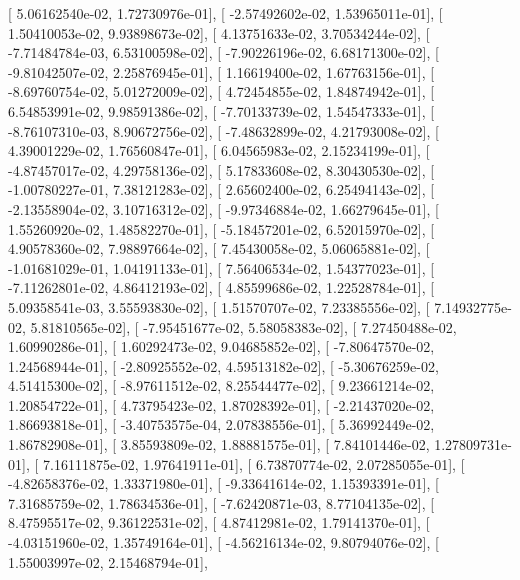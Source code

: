 \documentclass{article}
\begin{document}
       [  5.06162540e-02,   1.72730976e-01],
       [ -2.57492602e-02,   1.53965011e-01],
       [  1.50410053e-02,   9.93898673e-02],
       [  4.13751633e-02,   3.70534244e-02],
       [ -7.71484784e-03,   6.53100598e-02],
       [ -7.90226196e-02,   6.68171300e-02],
       [ -9.81042507e-02,   2.25876945e-01],
       [  1.16619400e-02,   1.67763156e-01],
       [ -8.69760754e-02,   5.01272009e-02],
       [  4.72454855e-02,   1.84874942e-01],
       [  6.54853991e-02,   9.98591386e-02],
       [ -7.70133739e-02,   1.54547333e-01],
       [ -8.76107310e-03,   8.90672756e-02],
       [ -7.48632899e-02,   4.21793008e-02],
       [  4.39001229e-02,   1.76560847e-01],
       [  6.04565983e-02,   2.15234199e-01],
       [ -4.87457017e-02,   4.29758136e-02],
       [  5.17833608e-02,   8.30430530e-02],
       [ -1.00780227e-01,   7.38121283e-02],
       [  2.65602400e-02,   6.25494143e-02],
       [ -2.13558904e-02,   3.10716312e-02],
       [ -9.97346884e-02,   1.66279645e-01],
       [  1.55260920e-02,   1.48582270e-01],
       [ -5.18457201e-02,   6.52015970e-02],
       [  4.90578360e-02,   7.98897664e-02],
       [  7.45430058e-02,   5.06065881e-02],
       [ -1.01681029e-01,   1.04191133e-01],
       [  7.56406534e-02,   1.54377023e-01],
       [ -7.11262801e-02,   4.86412193e-02],
       [  4.85599686e-02,   1.22528784e-01],
       [  5.09358541e-03,   3.55593830e-02],
       [  1.51570707e-02,   7.23385556e-02],
       [  7.14932775e-02,   5.81810565e-02],
       [ -7.95451677e-02,   5.58058383e-02],
       [  7.27450488e-02,   1.60990286e-01],
       [  1.60292473e-02,   9.04685852e-02],
       [ -7.80647570e-02,   1.24568944e-01],
       [ -2.80925552e-02,   4.59513182e-02],
       [ -5.30676259e-02,   4.51415300e-02],
       [ -8.97611512e-02,   8.25544477e-02],
       [  9.23661214e-02,   1.20854722e-01],
       [  4.73795423e-02,   1.87028392e-01],
       [ -2.21437020e-02,   1.86693818e-01],
       [ -3.40753575e-04,   2.07838556e-01],
       [  5.36992449e-02,   1.86782908e-01],
       [  3.85593809e-02,   1.88881575e-01],
       [  7.84101446e-02,   1.27809731e-01],
       [  7.16111875e-02,   1.97641911e-01],
       [  6.73870774e-02,   2.07285055e-01],
       [ -4.82658376e-02,   1.33371980e-01],
       [ -9.33641614e-02,   1.15393391e-01],
       [  7.31685759e-02,   1.78634536e-01],
       [ -7.62420871e-03,   8.77104135e-02],
       [  8.47595517e-02,   9.36122531e-02],
       [  4.87412981e-02,   1.79141370e-01],
       [ -4.03151960e-02,   1.35749164e-01],
       [ -4.56216134e-02,   9.80794076e-02],
       [  1.55003997e-02,   2.15468794e-01],
\end{document}
